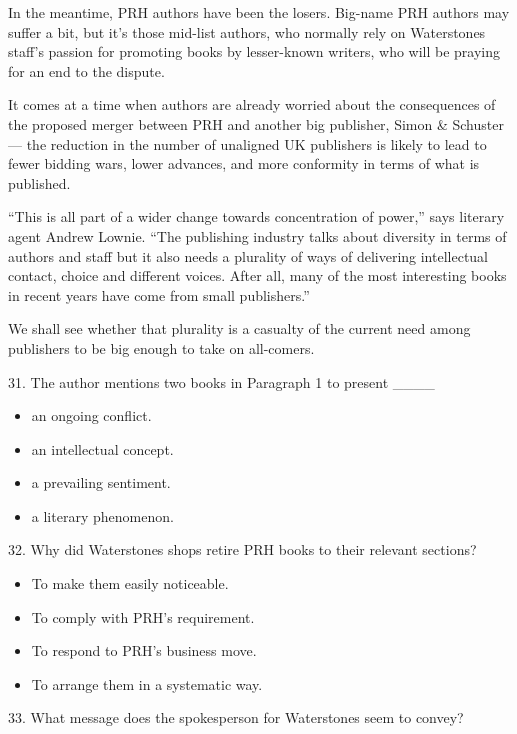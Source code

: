 \documentclass[UTF8,11pt]{ctexart}
\begin{document}
In the meantime, PRH authors have been the losers. Big-name PRH authors may suffer a bit, but it’s those mid-list authors, who normally rely on Waterstones staff’s passion for promoting books by lesser-known writers, who will be praying for an end to the dispute.


It comes at a time when authors are already worried about the consequences of the proposed merger between PRH and another big publisher, Simon \& Schuster — the reduction in the number of unaligned UK publishers is likely to lead to fewer bidding wars, lower advances, and more conformity in terms of what is published.


“This is all part of a wider change towards concentration of power,” says literary agent Andrew Lownie. “The publishing industry talks about diversity in terms of authors and staff but it also needs a plurality of ways of delivering intellectual contact, choice and different voices. After all, many of the most interesting books in recent years have come from small publishers.”


We shall see whether that plurality is a casualty of the current need among publishers to be big enough to take on all-comers.


31. The author mentions two books in Paragraph 1 to present \_\_\_\_


\begin{itemize}[leftmargin=2em,itemsep=.2em,topsep=.4em]\item[A.] an ongoing conflict.
\item[B.] an intellectual concept.
\item[C.] a prevailing sentiment.
\item[D.] a literary phenomenon.
\end{itemize}

32. Why did Waterstones shops retire PRH books to their relevant sections?


\begin{itemize}[leftmargin=2em,itemsep=.2em,topsep=.4em]\item[A.] To make them easily noticeable.
\item[B.] To comply with PRH’s requirement.
\item[C.] To respond to PRH’s business move.
\item[D.] To arrange them in a systematic way.
\end{itemize}

33. What message does the spokesperson for Waterstones seem to convey?
\end{document}
